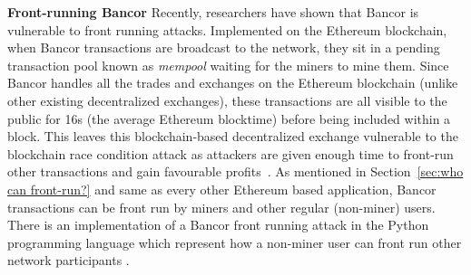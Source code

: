 \par\noindent\textbf{Front-running Bancor} Recently, researchers have shown that Bancor is vulnerable to front running attacks. Implemented on the Ethereum blockchain, when Bancor transactions are broadcast to the network, they sit in a pending transaction pool known as \textit{mempool} waiting for the miners to mine them. Since Bancor handles all the trades and exchanges on the Ethereum blockchain (unlike other existing decentralized exchanges), these transactions are all visible to the public for 16s (the average Ethereum blocktime) before being included within a block. This leaves this blockchain-based decentralized exchange vulnerable to the blockchain race condition attack as attackers are given enough time to front-run other transactions and gain favourable profits~\cite{BancorIs7:online}. As mentioned in Section~\ref{sec:who can front-run?} and same as every other Ethereum based application, Bancor transactions can be front run by miners and other regular (non-miner) users. There is an implementation of a Bancor front running attack in the Python programming language which represent how a non-miner user can front run other network participants \cite{NewTab13:online}.




